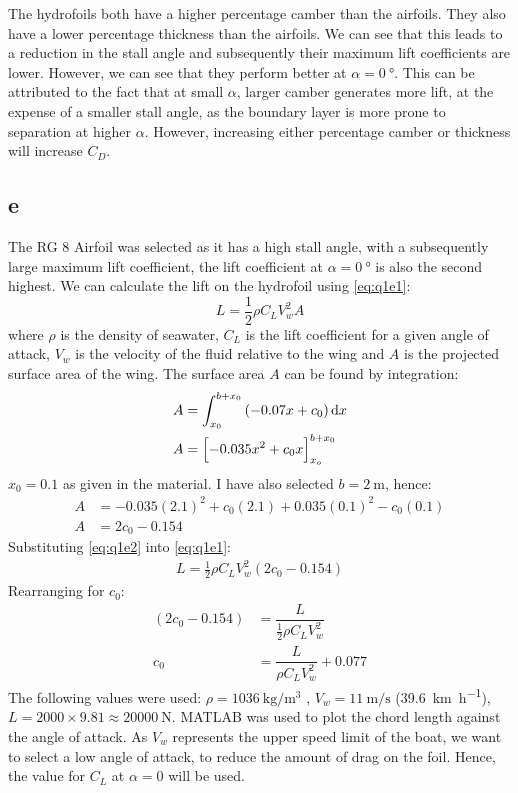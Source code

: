\documentclass[11pt]{article}
\numberwithin{equation}{section}
\begin{document}
The hydrofoils both have a higher percentage camber than the airfoils. They also have a lower percentage thickness than the airfoils. We can see that this leads to a reduction in the stall angle and subsequently their maximum lift coefficients are lower. However, we can see that they perform better at $\alpha = \SI{0}{\degree}$. This can be attributed to the fact that at small $\alpha$, larger camber generates more lift, at the expense of a smaller stall angle, as the boundary layer is more prone to separation at higher $\alpha$. However, increasing either percentage camber or thickness will increase $C_D$.
\subsection{e}
The RG 8 Airfoil was selected as it has a high stall angle, with a subsequently large maximum lift coefficient, the lift coefficient at $\alpha = \SI{0}{\degree}$ is also the second highest. We can calculate the lift on the hydrofoil using \ref{eq:q1e1}:
\begin{equation}
    L = \frac{1}{2}\rho C_L V_{w}^2 A \label{eq:q1e1}
\end{equation}
where $\rho$ is the density of seawater, $C_L$ is the lift coefficient for a given angle of attack, $V_w$ is the velocity of the fluid relative to the wing and $A$ is the projected surface area of the wing. The surface area $A$ can be found by integration:
\begin{align}
    A &= \int_{x_0}^{b + x_0} \left(-0.07x + c_0\right)\dif x\\
    A &= \left[-0.035x^2 + c_0x\right]_{x_o}^{b+x_0}
\end{align}
$x_0 = 0.1$ as given in the material. I have also selected $b = \SI{2}{\meter}$, hence:
\begin{align}
    A &= -0.035(2.1)^2 + c_0(2.1) + 0.035(0.1)^2 - c_0(0.1)\\
    A &= 2c_0 - 0.154 \label{eq:q1e2}
\end{align}
Substituting \ref{eq:q1e2} into \ref{eq:q1e1}:
\begin{align}
    L = \frac{1}{2}\rho C_L V_{w}^2 \left(2c_0 - 0.154\right)
\end{align}
Rearranging for $c_0$:
\begin{align}
    \left(2c_0 - 0.154\right) &= \dfrac{L}{\frac{1}{2}\rho C_L V_{w}^2}\\
    c_0 &= \dfrac{L}{\rho C_L V_{w}^2} + 0.077
\end{align}
The following values were used: $\rho = \SI{1036}{\kg\per\meter\cubed}$ \cite{b1}, $V_w = \SI{11}{\meter\per\second}$ (\SI{39.6}{\kilo\meter\per\hour}), $L = 2000\times 9.81 \approx \SI{20000}{\newton}$. MATLAB was used to plot the chord length against the angle of attack. As $V_w$ represents the upper speed limit of the boat, we want to select a low angle of attack, to reduce the amount of drag on the foil. Hence, the value for $C_L$ at $\alpha = 0$ will be used. 
\end{document}

